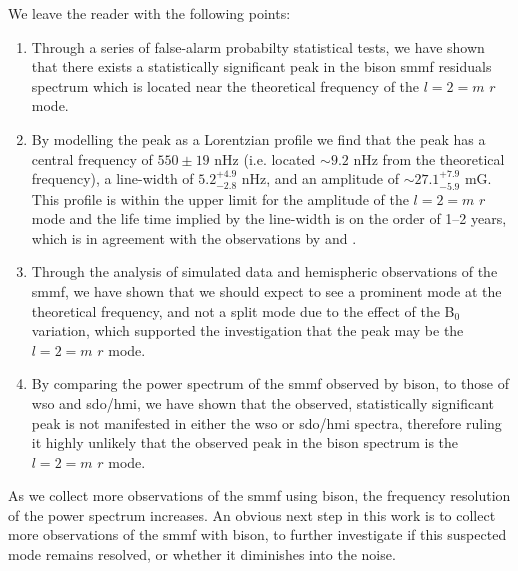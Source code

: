 We leave the reader with the following points:

\begin{enumerate}
	\item{Through a series of false-alarm probabilty statistical tests, we have shown that there exists a statistically significant peak in the \gls{bison} \gls{smmf} residuals spectrum which is located near the theoretical frequency of the $l=2=m$ $r$ mode.}
	
	\item{By modelling the peak as a Lorentzian profile we find that the peak has a central frequency of $550 \pm 19$ nHz (i.e. located $\sim 9.2$ nHz from the theoretical frequency), a line-width of $5.2^{+4.9}_{-2.8}$ nHz, and an amplitude of $\sim 27.1^{+7.9}_{-5.9}$ mG. This profile is within the upper limit for the amplitude of the $l=2=m$ $r$ mode and the life time implied by the line-width is on the order of 1--2 years, which is in agreement with the observations by \citet{loptien_global-scale_2018} and \citet{liang_time-distance_2019}.}
	
	\item{Through the analysis of simulated data and hemispheric observations of the \gls{smmf}, we have shown that we should expect to see a prominent mode at the theoretical frequency, and not a split mode due to the effect of the B$_0$ variation, which supported the investigation that the peak may be the $l=2=m$ $r$ mode.}
	
	\item{By comparing the power spectrum of the \gls{smmf} observed by \gls{bison}, to those of \gls{wso} and \gls{sdo/hmi}, we have shown that the observed, statistically significant peak is not manifested in either the \gls{wso} or \gls{sdo/hmi} spectra, therefore ruling it highly unlikely that the observed peak in the \gls{bison} spectrum is the $l=2=m$ $r$ mode.}
\end{enumerate}


As we collect more observations of the \gls{smmf} using \gls{bison}, the frequency resolution of the power spectrum increases. An obvious next step in this work is to collect more observations of the \gls{smmf} with \gls{bison}, to further investigate if this suspected mode remains resolved, or whether it diminishes into the noise.
